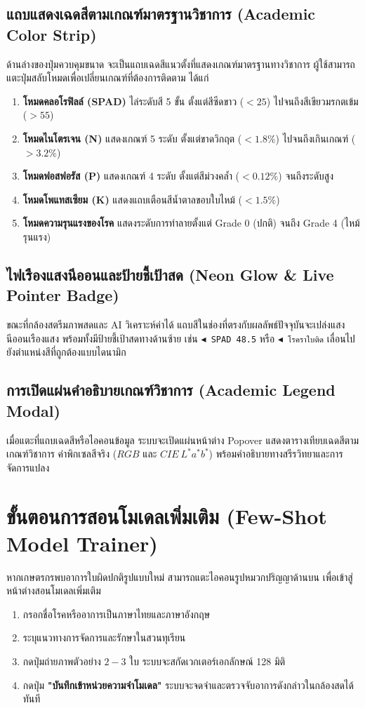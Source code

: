 \subsection{แถบแสดงเฉดสีตามเกณฑ์มาตรฐานวิชาการ (Academic Color Strip)}
ด้านล่างของปุ่มควบคุมขนาด จะเป็นแถบเฉดสีแนวตั้งที่แสดงเกณฑ์มาตรฐานทางวิชาการ ผู้ใช้สามารถแตะปุ่มสลับโหมดเพื่อเปลี่ยนเกณฑ์ที่ต้องการติดตาม ได้แก่
\begin{enumerate}
  \item \textbf{โหมดคลอโรฟิลล์ (SPAD)} ไล่ระดับสี 5 ขั้น ตั้งแต่สีซีดขาว ($<25$) ไปจนถึงสีเขียวมรกตเข้ม ($>55$)
  \item \textbf{โหมดไนโตรเจน (N)} แสดงเกณฑ์ 5 ระดับ ตั้งแต่ขาดวิกฤต ($<1.8\%$) ไปจนถึงเกินเกณฑ์ ($>3.2\%$)
  \item \textbf{โหมดฟอสฟอรัส (P)} แสดงเกณฑ์ 4 ระดับ ตั้งแต่สีม่วงคล้ำ ($<0.12\%$) จนถึงระดับสูง
  \item \textbf{โหมดโพแทสเซียม (K)} แสดงแถบเตือนสีน้ำตาลขอบใบไหม้ ($<1.5\%$)
  \item \textbf{โหมดความรุนแรงของโรค} แสดงระดับการทำลายตั้งแต่ Grade 0 (ปกติ) จนถึง Grade 4 (ไหม้รุนแรง)
\end{enumerate}

\subsection{ไฟเรืองแสงนีออนและป้ายชี้เป้าสด (Neon Glow \& Live Pointer Badge)}
ขณะที่กล้องสตรีมภาพสดและ AI วิเคราะห์ค่าได้ แถบสีในช่องที่ตรงกับผลลัพธ์ปัจจุบันจะเปล่งแสงนีออนเรืองแสง พร้อมทั้งมีป้ายชี้เป้าสดทางด้านซ้าย เช่น \texttt{$\blacktriangleleft$ SPAD 48.5} หรือ \texttt{$\blacktriangleleft$ โรคราใบติด} เลื่อนไปยังตำแหน่งสีที่ถูกต้องแบบไดนามิก

\subsection{การเปิดแผ่นคำอธิบายเกณฑ์วิชาการ (Academic Legend Modal)}
เมื่อแตะที่แถบเฉดสีหรือไอคอนข้อมูล ระบบจะเปิดแผ่นหน้าต่าง Popover แสดงตารางเทียบเฉดสีตามเกณฑ์วิชาการ ค่าพิกเซลสีจริง ($RGB$ และ $CIE\ L^*a^*b^*$) พร้อมคำอธิบายทางสรีรวิทยาและการจัดการแปลง

\section{ขั้นตอนการสอนโมเดลเพิ่มเติม (Few-Shot Model Trainer)}
หากเกษตรกรพบอาการใบผิดปกติรูปแบบใหม่ สามารถแตะไอคอนรูปหมวกปริญญาด้านบน เพื่อเข้าสู่หน้าต่างสอนโมเดลเพิ่มเติม
\begin{enumerate}
  \item กรอกชื่อโรคหรืออาการเป็นภาษาไทยและภาษาอังกฤษ
  \item ระบุแนวทางการจัดการและรักษาในสวนทุเรียน
  \item กดปุ่มถ่ายภาพตัวอย่าง $2 - 3$ ใบ ระบบจะสกัดเวกเตอร์เอกลักษณ์ 128 มิติ
  \item กดปุ่ม \textbf{"บันทึกเข้าหน่วยความจำโมเดล"} ระบบจะจดจำและตรวจจับอาการดังกล่าวในกล้องสดได้ทันที
\end{enumerate}
